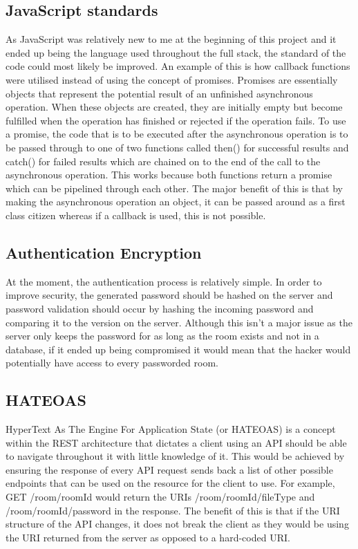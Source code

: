 \documentclass[]{report}
\begin{document}
			\subsection{JavaScript standards}
			As JavaScript was relatively new to me at the beginning of this project and it ended up being the language used throughout the full stack, the standard of the code could most likely be improved. An example of this is how callback functions were utilised instead of using the concept of promises. Promises are essentially objects that represent the potential result of an unfinished asynchronous operation. When these objects are created, they are initially empty but become fulfilled when the operation has finished or rejected if the operation fails. To use a promise, the code that is to be executed after the asynchronous operation is to be passed through to one of two functions called then() for successful results and catch() for failed results which are chained on to the end of the call to the asynchronous operation. This works because both functions return a promise which can be pipelined through each other. The major benefit of this is that by making the asynchronous operation an object, it can be passed around as a first class citizen whereas if a callback is used, this is not possible.	

			\subsection{Authentication Encryption}
			At the moment, the authentication process is relatively simple. In order to improve security, the generated password should be hashed on the server and password validation should occur by hashing the incoming password and comparing it to the version on the server. Although this isn't a major issue as the server only keeps the password for as long as the room exists and not in a database, if it ended up being compromised it would mean that the hacker would potentially have access to every passworded room. 
			
			\subsection{HATEOAS}
			HyperText As The Engine For Application State (or HATEOAS) is a concept within the REST architecture that dictates a client using an API should be able to navigate throughout it with little knowledge of it. This would be achieved by ensuring the response of every API request sends back a list of other possible endpoints that can be used on the resource for the client to use. For example, GET /room/{roomId} would return the URIs /room/{roomId}/fileType and /room/{roomId}/password in the response. The benefit of this is that if the URI structure of the API changes, it does not break the client as they would be using the URI returned from the server as opposed to a hard-coded URI.
			
\end{document}
